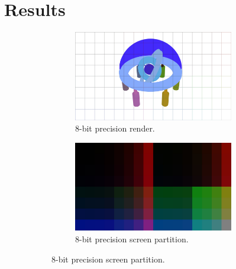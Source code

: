 \documentclass[conference]{IEEEtran}
\begin{document}
\section{Results}
\begin{figure}[htbp]
\centering
\begin{subfigure}{\textwidth}
  \centering
    \begin{subfigure}{.49\textwidth}
      \centering
      \includegraphics[width=\linewidth]{8_render.jpg}
      \caption{8-bit precision render.}
      \label{fig:render_8}
    \end{subfigure}
    \begin{subfigure}{.49\textwidth}
      \centering
      \includegraphics[width=\linewidth]{8_partition.jpg}
      \caption{8-bit precision screen partition.}
      \label{fig:render_8}
    \end{subfigure}
  \label{fig:render_8}
\end{subfigure}
\par\medskip
\begin{subfigure}{\textwidth}
  \centering
    \begin{subfigure}{.49\textwidth}

\end{subfigure}
\end{subfigure}
\end{figure}
\end{document}
